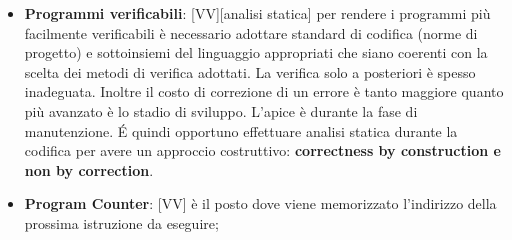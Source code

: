 \begin{itemize}
	\item \textbf{Programmi verificabili}: [VV][analisi statica] per rendere i programmi più facilmente verificabili è necessario adottare standard di codifica (norme di progetto) e sottoinsiemi del linguaggio appropriati che siano coerenti con la scelta dei metodi di verifica adottati. La verifica solo a posteriori è spesso inadeguata. Inoltre il costo di correzione di un errore è tanto maggiore quanto più avanzato è lo stadio di sviluppo. L'apice è durante la fase di manutenzione. \'E quindi opportuno effettuare analisi statica durante la codifica per avere un approccio costruttivo: \textbf{correctness by construction e non by correction}. 

	\item \textbf{Program Counter}: [VV] è il posto dove viene memorizzato l'indirizzo della prossima istruzione da eseguire;
\end{itemize}